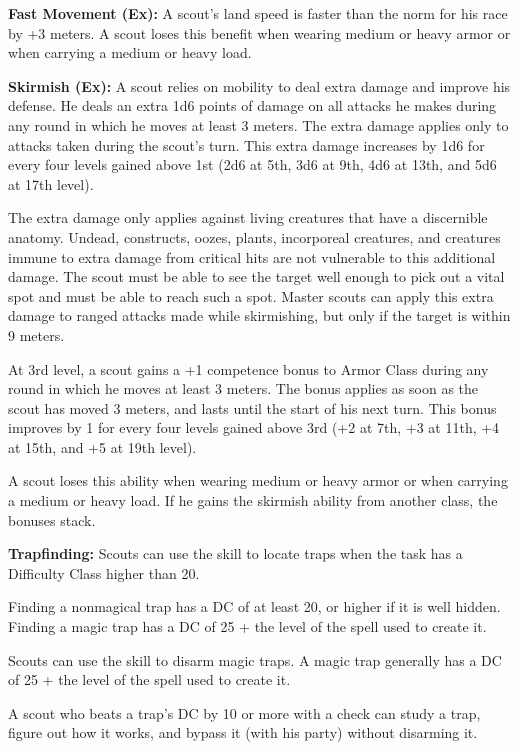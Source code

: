 \textbf{Fast Movement (Ex):} A scout's land speed is faster than the norm for his race by +3 meters. A scout loses this benefit when wearing medium or heavy armor or when carrying a medium or heavy load.


\textbf{Skirmish (Ex):} A scout relies on mobility to deal extra damage and improve his defense. He deals an extra 1d6 points of damage on all attacks he makes during any round in which he moves at least 3 meters. The extra damage applies only to attacks taken during the scout's turn. This extra damage increases by 1d6 for every four levels gained above 1st (2d6 at 5th, 3d6 at 9th, 4d6 at 13th, and 5d6 at 17th level).

The extra damage only applies against living creatures that have a discernible anatomy. Undead, constructs, oozes, plants, incorporeal creatures, and creatures immune to extra damage from critical hits are not vulnerable to this additional damage. The scout must be able to see the target well enough to pick out a vital spot and must be able to reach such a spot. Master scouts can apply this extra damage to ranged attacks made while skirmishing, but only if the target is within 9 meters.

At 3rd level, a scout gains a +1 competence bonus to Armor Class during any round in which he moves at least 3 meters. The bonus applies as soon as the scout has moved 3 meters, and lasts until the start of his next turn. This bonus improves by 1 for every four levels gained above 3rd (+2 at 7th, +3 at 11th, +4 at 15th, and +5 at 19th level).

A scout loses this ability when wearing medium or heavy armor or when carrying a medium or heavy load. If he gains the skirmish ability from another class, the bonuses stack.


\textbf{Trapfinding:} Scouts can use the  skill to locate traps when the task has a Difficulty Class higher than 20.

Finding a nonmagical trap has a DC of at least 20, or higher if it is well hidden. Finding a magic trap has a DC of 25 + the level of the spell used to create it.

Scouts can use the  skill to disarm magic traps. A magic trap generally has a DC of 25 + the level of the spell used to create it.

A scout who beats a trap's DC by 10 or more with a  check can study a trap, figure out how it works, and bypass it (with his party) without disarming it.


